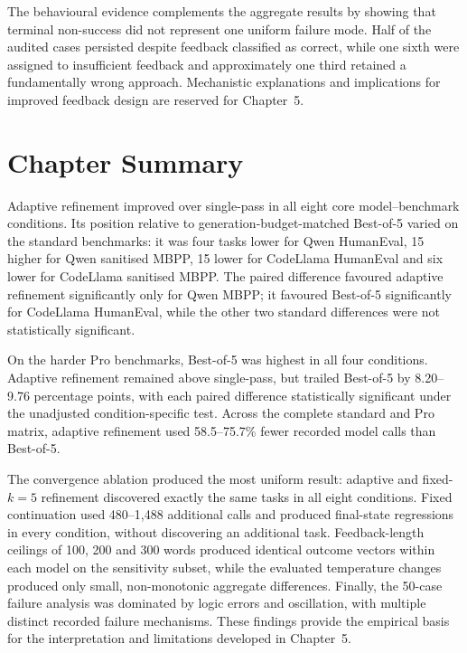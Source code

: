 The behavioural evidence complements the aggregate results by showing that terminal non-success did not represent one uniform failure mode. Half of the audited cases persisted despite feedback classified as correct, while one sixth were assigned to insufficient feedback and approximately one third retained a fundamentally wrong approach. Mechanistic explanations and implications for improved feedback design are reserved for Chapter~5.

\section{Chapter Summary}

Adaptive refinement improved over single-pass in all eight core model--benchmark conditions. Its position relative to generation-budget-matched Best-of-5 varied on the standard benchmarks: it was four tasks lower for Qwen HumanEval, 15 higher for Qwen sanitised MBPP, 15 lower for CodeLlama HumanEval and six lower for CodeLlama sanitised MBPP. The paired difference favoured adaptive refinement significantly only for Qwen MBPP; it favoured Best-of-5 significantly for CodeLlama HumanEval, while the other two standard differences were not statistically significant.

On the harder Pro benchmarks, Best-of-5 was highest in all four conditions. Adaptive refinement remained above single-pass, but trailed Best-of-5 by 8.20--9.76 percentage points, with each paired difference statistically significant under the unadjusted condition-specific test. Across the complete standard and Pro matrix, adaptive refinement used 58.5--75.7\% fewer recorded model calls than Best-of-5.

The convergence ablation produced the most uniform result: adaptive and fixed-$k=5$ refinement discovered exactly the same tasks in all eight conditions. Fixed continuation used 480--1,488 additional calls and produced final-state regressions in every condition, without discovering an additional task. Feedback-length ceilings of 100, 200 and 300 words produced identical outcome vectors within each model on the sensitivity subset, while the evaluated temperature changes produced only small, non-monotonic aggregate differences. Finally, the 50-case failure analysis was dominated by logic errors and oscillation, with multiple distinct recorded failure mechanisms. These findings provide the empirical basis for the interpretation and limitations developed in Chapter~5.
